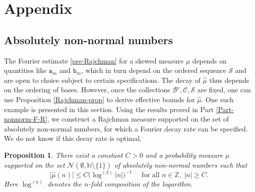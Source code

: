 \documentclass[12pt, twoside]{article}
\newtheorem{proposition}[theorem]{Proposition}
\theoremstyle{definition}
\numberwithin{equation}{section}
\begin{document}
\section{Appendix} \label{Appendix}
\subsection{Absolutely non-normal numbers} \label{abs-non-normal-section}
The Fourier estimate \eqref{pre-Rajchman}  for a skewed measure $\mu$ depends on quantities like $\mathtt a_m$ and $\mathtt b_m$, which in turn depend on the ordered sequence $\mathcal S$ and are open to choice subject to certain specifications. The decay of $\widehat{\mu}$ thus depends on the ordering of bases. However, once the collections $\mathscr{B}', \mathscr{C}, \mathcal S$ are fixed, one can use Proposition \ref{Rajchman-prop} to derive effective bounds for $\widehat{\mu}$. One such example is presented in this section. Using the results proved in Part \ref{Part-nonnorm-F-R}, we construct a Rajchman measure supported on the set of absolutely non-normal numbers, for which a Fourier decay rate can be specified.  We do not know if this decay rate is optimal.
\begin{proposition} \label{abs-non-normal-prop} 
There exist a constant $C > 0$ and a probability measure $\mu$ supported on the set $\mathscr{N}(\emptyset, \mathbb N \setminus \{1\})$ of absolutely non-normal numbers such that 
\begin{equation} \label{abs-non-normal-decay}
\bigl|\widehat{\mu}(n) \bigr| \leq C \bigl( \log^{(3)} |n| \bigr)^{-1} \quad \text{ for all } n \in \mathbb Z, \; |n| \geq C. 
\end{equation} 
Here $\log^{(n)}$ denotes the $n$-fold composition of the logarithm. 
\end{proposition}
\end{document}
